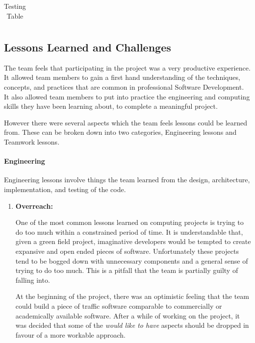 \documentclass[11pt]{article}
\begin{document}
{\begin{center}
\begin{table}[!htb]
\begin{tabular}{|m{7cm}|m{7cm}|}
	\end{tabular}
	\caption{Testing Table}
		\label{table:TestingTable}
	\end{table}
\end{center}

\pagebreak
\subsection{Lessons Learned and Challenges}

The team feels that participating in the project was a very productive experience. It allowed team members to gain a first hand understanding of the techniques, concepts, and practices that are common in professional Software Development. It also allowed team members to put into practice the engineering and computing skills they have been learning about, to complete a meaningful project. 

However there were several aspects which the team feels lessons could be learned from.
These can be broken down into two categories, Engineering lessons and Teamwork lessons.

\paragraph{Engineering}

Engineering lessons involve things the team learned from the design, architecture, implementation, and testing of the code.

\begin{enumerate}
	
	\item \textbf{Overreach:}
	
	One of the most common lessons learned on computing projects is trying to do too much within a constrained period of time. It is understandable that, given a green field project, imaginative developers would be tempted to create expansive and open ended pieces of software. Unfortunately these projects tend to be bogged down with unnecessary components and a general sense of trying to do too much. This is a pitfall that the team is partially guilty of falling into. 
	
	At the beginning of the project, there was an optimistic feeling that the team could build a piece of traffic software comparable to commercially or academically available software. After a while of working on the project, it was decided that some of the \textit{would like to have} aspects should be dropped in favour of a more workable approach.
	

\end{enumerate}}
\end{document}
